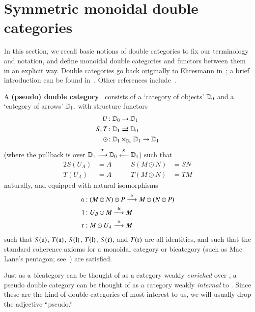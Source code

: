 \section{Symmetric monoidal double categories}
\label{sec:symm-mono-double}

In this section, we recall basic notions of double categories to fix our terminology and notation, and define monoidal double categories and functors between them in an explicit way.
Double categories go back originally to Ehresmann
in~\cite{ehresmann:cat-str}; a brief introduction can be found
in~\cite{ks:r2cats}.  Other references
include~\cite{multi_funct_i,gp:double-limits,gp:double-adjoints}.


\begin{defn}\label{def:dblcat}
  A \textbf{(pseudo) double category} \lD\ consists of a `category of
  objects' $\lD_0$ and a `category of arrows' $\lD_1$, with structure
  functors
  \begin{align*}
    U&\maps \lD_0\to \lD_1\\
    S,T&\maps \lD_1\rightrightarrows \lD_0\\
    \odot&\maps \lD_1\times_{\lD_0}\lD_1\to \lD_1
  \end{align*}
  (where the pullback is over
  $\lD_1\too[T]\lD_0\overset{S}{\longleftarrow} \lD_1$) such that
  \begin{alignat*}{2}
    S(U_A) &= A &\qquad
    S(M\odot N) &= SN\\
    T(U_A) &= A &\qquad
    T(M\odot N) &= TM
  \end{alignat*}
  naturally, and equipped with natural isomorphisms
  \begin{align*}
    \fa &: (M\odot N) \odot P \too[\iso] M \odot (N \odot P)\\
    \fl &: U_B \odot M \too[\iso] M\\
    \fr &: M \odot U_A \too[\iso] M
  \end{align*}
  such that $S(\fa)$, $T(\fa)$, $S(\fl)$, $T(\fl)$, $S(\fr)$, and
  $T(\fr)$ are all identities, and such that the standard coherence
  axioms for a monoidal category or bicategory (such as Mac Lane's
  pentagon; see~\cite{maclane}) are satisfied.
\end{defn}

Just as a bicategory can be thought of as a category weakly
\emph{enriched} over \cCat, a pseudo double category can be thought of
as a category weakly \emph{internal} to \cCat.  Since these are the
kind of double categories of most interest to us, we will usually drop
the adjective ``pseudo.''

